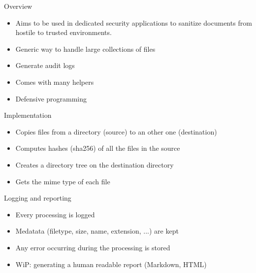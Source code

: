 
\begin{frame}[t,plain]
    \titlepage
\end{frame}

\begin{frame}[fragile]{Overview}
    \begin{itemize}
        \item Aims to be used in dedicated security applications to sanitize documents from hostile to trusted environments.
        \item Generic way to handle large collections of files
        \item Generate audit logs
        \item Comes with many helpers
        \item Defensive programming
   \end{itemize}
\end{frame}

\begin{frame}[fragile]{Implementation}
    \begin{itemize}
        \item Copies files from a directory (source) to an other one (destination)
        \item Computes hashes (sha256) of all the files in the source
        \item Creates a directory tree on the destination directory
        \item Gets the mime type of each file
   \end{itemize}
\end{frame}

\begin{frame}[fragile]{Logging and reporting}
    \begin{itemize}
        \item Every processing is logged
        \item Medatata (filetype, size, name, extension, ...) are kept
        \item Any error occurring during the processing is stored
        \item WiP: generating a human readable report (Markdown, HTML)
   \end{itemize}
\end{frame}

